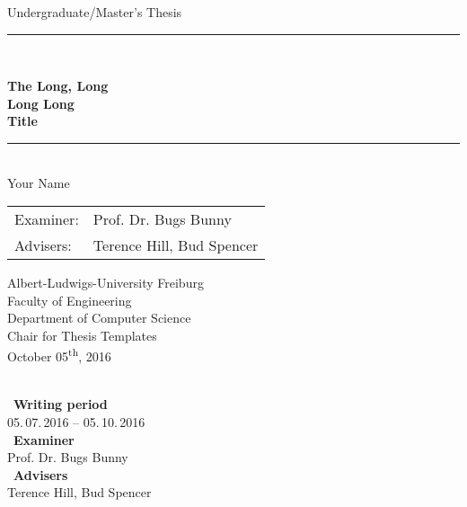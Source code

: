 
\begin{titlepage}
\begin{center}

\newcommand{\HorizontalLine}{\rule{\linewidth}{0.3mm}}

{\Large Undergraduate/Master's Thesis}\\[1.3cm]


\HorizontalLine \\[0.4cm]
\begin{spacing}{3}
    {\huge \bfseries The Long, Long } \\
    {\huge \bfseries Long Long} \\
    {\huge \bfseries Title}\\
\end{spacing}
\HorizontalLine \\[1.5cm]


{\Huge Your Name} \\[2cm]


\begin{tabular}[hc]{>{\huge}l >{\huge}l}
  Examiner: & Prof. Dr. Bugs Bunny \\[0.3cm]
  Advisers: & Terence Hill, Bud Spencer \\[1.2cm]
\end{tabular}
\vfill  %

\Large {
    Albert-Ludwigs-University Freiburg\\
    Faculty of Engineering\\
    Department of Computer Science\\
    Chair for Thesis Templates\\[1cm]

    October 05\textsuperscript{th}, 2016\\
}
\end{center}
\end{titlepage}

\ \vfill \ \\  %
\
\textbf{Writing period}            \smallskip{} \\
05.\,07.\,2016 -- 05.\,10.\,2016   \bigskip{} \\
\
\textbf{Examiner}                  \smallskip{} \\
Prof. Dr. Bugs Bunny               \bigskip{} \\
\
\textbf{Advisers}                  \smallskip{} \\
Terence Hill, Bud Spencer
